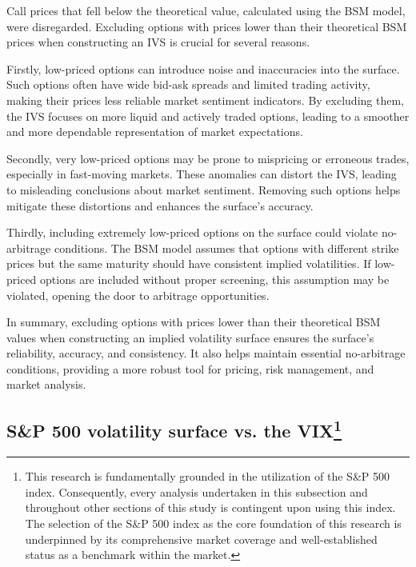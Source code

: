 Call prices that fell below the theoretical value, calculated using the BSM model, were disregarded. Excluding options with prices lower than their theoretical BSM prices when constructing an IVS is crucial for several reasons. 

Firstly, low-priced options can introduce noise and inaccuracies into the surface. Such options often have wide bid-ask spreads and limited trading activity, making their prices less reliable market sentiment indicators. By excluding them, the IVS focuses on more liquid and actively traded options, leading to a smoother and more dependable representation of market expectations.

Secondly, very low-priced options may be prone to mispricing or erroneous trades, especially in fast-moving markets. These anomalies can distort the IVS, leading to misleading conclusions about market sentiment. Removing such options helps mitigate these distortions and enhances the surface's accuracy.

Thirdly, including extremely low-priced options on the surface could violate no-arbitrage conditions. The BSM model assumes that options with different strike prices but the same maturity should have consistent implied volatilities. If low-priced options are included without proper screening, this assumption may be violated, opening the door to arbitrage opportunities.

In summary, excluding options with prices lower than their theoretical BSM values when constructing an implied volatility surface ensures the surface's reliability, accuracy, and consistency. It also helps maintain essential no-arbitrage conditions, providing a more robust tool for pricing, risk management, and market analysis.

\subsection{S\&P 500 volatility surface vs. the VIX\protect\footnote{This research is fundamentally grounded in the utilization of the S\&P 500 index. Consequently, every analysis undertaken in this subsection and throughout other sections of this study is contingent upon using this index. The selection of the S\&P 500 index as the core foundation of this research is underpinned by its comprehensive market coverage and well-established status as a benchmark within the market.}}\label{sec:VIX}

